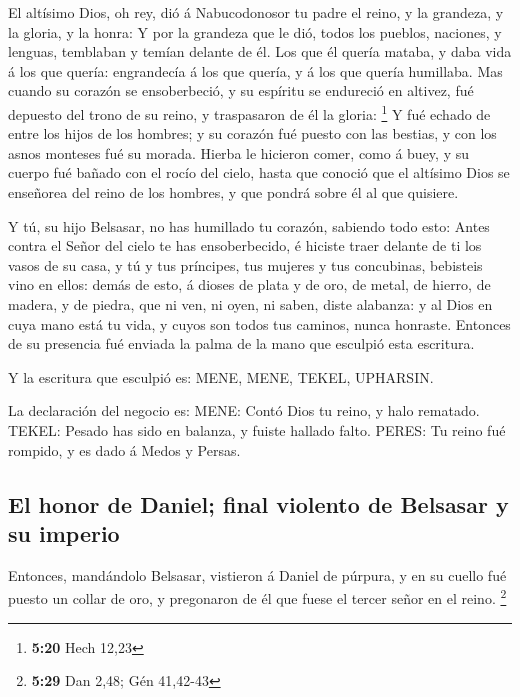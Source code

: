  El altísimo Dios, oh rey, dió á Nabucodonosor tu padre
el reino, y la grandeza, y la gloria, y la honra:  Y por
la grandeza que le dió, todos los pueblos, naciones, y lenguas,
temblaban y temían delante de él. Los que él quería mataba, y daba vida
á los que quería: engrandecía á los que quería, y á los que quería
humillaba.  Mas cuando su corazón se ensoberbeció, y su
espíritu se endureció en altivez, fué depuesto del trono de su reino, y
traspasaron de él la gloria: \footnote{\textbf{5:20} Hech 12,23}
 Y fué echado de entre los hijos de los hombres; y su
corazón fué puesto con las bestias, y con los asnos monteses fué su
morada. Hierba le hicieron comer, como á buey, y su cuerpo fué bañado
con el rocío del cielo, hasta que conoció que el altísimo Dios se
enseñorea del reino de los hombres, y que pondrá sobre él al que
quisiere.

 Y tú, su hijo Belsasar, no has humillado tu corazón,
sabiendo todo esto:  Antes contra el Señor del cielo te
has ensoberbecido, é hiciste traer delante de ti los vasos de su casa, y
tú y tus príncipes, tus mujeres y tus concubinas, bebisteis vino en
ellos: demás de esto, á dioses de plata y de oro, de metal, de hierro,
de madera, y de piedra, que ni ven, ni oyen, ni saben, diste alabanza: y
al Dios en cuya mano está tu vida, y cuyos son todos tus caminos, nunca
honraste.  Entonces de su presencia fué enviada la palma
de la mano que esculpió esta escritura.

 Y la escritura que esculpió es: MENE, MENE, TEKEL,
UPHARSIN.

 La declaración del negocio es: MENE: Contó Dios tu
reino, y halo rematado.  TEKEL: Pesado has sido en
balanza, y fuiste hallado falto.  PERES: Tu reino fué
rompido, y es dado á Medos y Persas.

\hypertarget{el-honor-de-daniel-final-violento-de-belsasar-y-su-imperio}{%
\subsection{El honor de Daniel; final violento de Belsasar y su
imperio}\label{el-honor-de-daniel-final-violento-de-belsasar-y-su-imperio}}

 Entonces, mandándolo Belsasar, vistieron á Daniel de
púrpura, y en su cuello fué puesto un collar de oro, y pregonaron de él
que fuese el tercer señor en el reino. \footnote{\textbf{5:29} Dan 2,48;
  Gén 41,42-43}

